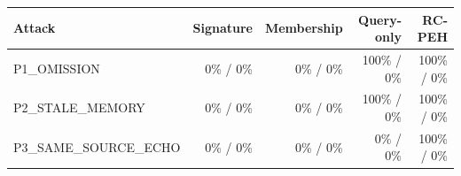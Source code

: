 \begin{tabular}{lrrrr}
Attack & Signature & Membership & Query-only & RC-PEH \\
\hline
P1\_OMISSION & 0\% / 0\% & 0\% / 0\% & 100\% / 0\% & 100\% / 0\% \\
P2\_STALE\_MEMORY & 0\% / 0\% & 0\% / 0\% & 100\% / 0\% & 100\% / 0\% \\
P3\_SAME\_SOURCE\_ECHO & 0\% / 0\% & 0\% / 0\% & 0\% / 0\% & 100\% / 0\% \\
\end{tabular}
